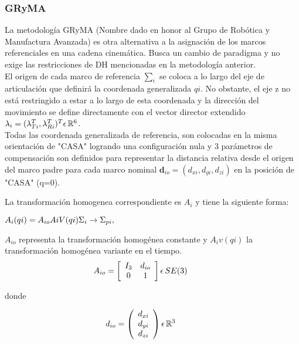     \subsubsection{GRyMA}
    \noindent La metodología GRyMA (Nombre dado en honor al Grupo de Robótica y Manufactura Avanzada) es otra alternativa
    a la asignación de los marcos referenciales en una cadena cinemática. Busca un cambio de paradigma y no exige las
    restricciones de DH mencionadas en la metodología anterior. \\ 
    \noindent El origen de cada marco de referencia $ \sum_i$ se coloca a lo largo del eje de articulación que definirá
    la coordenada generalizada $ qi$. No obstante, el eje z no está restringido a estar a lo largo de esta coordenada
    y la dirección del movimiento se define directamente con el vector director extendido
    $ \lambda_i=(\lambda_{Ti}^T, \lambda_{Ri}^T)^T \epsilon \thinspace \mathbb{R}^6 $.  \\ 
    \noindent Todas las coordenada generalizada de referencia, son colocadas en la misma orientación de "CASA" logrando
    una configuración nula y 3 parámetros de compensación son definidos para representar la distancia relativa desde el
    origen del marco padre para cada marco nominal $ \mathbf{d}_{io}=(d_{xi}, d_{yi}, d_{zi})$ en la posición de "CASA"
    (q=0).

    La transformación homogenea correspondiente es $A_i$ y tiene la siguiente forma:

    $A_i(qi)=A_{io}A{iV}(qi) \hfill \Sigma_i \rightarrow \Sigma_{pi},$

    $A_{io}$ representa la transformación homogénea constante y $A_iv(qi)$ la transformación homogénea variante en el
    tiempo.
    \begin{equation*}
        \hspace{-10mm}
        A_{io} = \left[
            \begin{array}{cc}
                I_{3} & d_{io}\\
                0 & 1\\
            \end{array}\right]  \epsilon \thinspace SE(3) 
    \end{equation*} 

    donde 

    \begin{equation*}
        \hspace{-10mm}
        d_{io} = \left(
            \begin{array}{c}
                d_{xi}\\
                d_{yi}\\
                d_{zi}\\
            \end{array}\right) \epsilon \thinspace \mathbb{R}^3 
    \end{equation*} 


